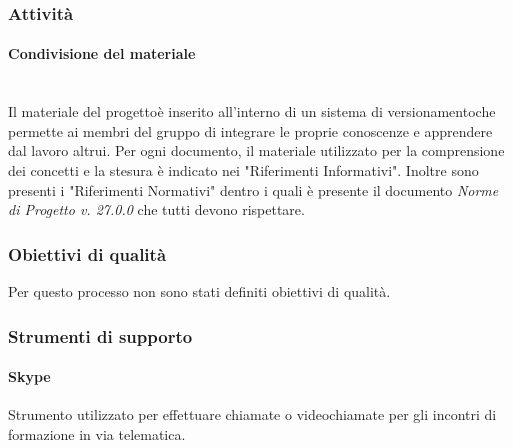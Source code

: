 		\subsubsection{Attività}
			\paragraph{Condivisione del materiale}\mbox{}\\ [1mm]
				Il materiale del progetto\glosp è inserito all'interno di un sistema di versionamento\glosp che permette ai membri del gruppo di integrare le proprie conoscenze e apprendere dal lavoro altrui.
				Per ogni documento, il materiale utilizzato per la comprensione dei concetti e la stesura è indicato nei "Riferimenti Informativi".
				Inoltre sono presenti i "Riferimenti Normativi" dentro i quali è presente il documento \textit{Norme di Progetto v. 27.0.0} che tutti devono rispettare.
		\subsubsection{Obiettivi di qualità}
			Per questo processo non sono stati definiti obiettivi di qualità.
		\subsubsection{Strumenti di supporto}
			\paragraph{Skype}
		 		Strumento utilizzato per effettuare chiamate o videochiamate per gli incontri di formazione in via telematica.
			
